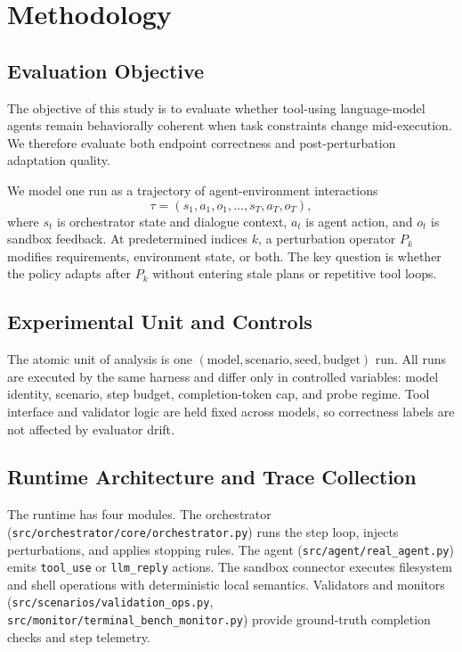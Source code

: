 \section{Methodology}
\label{sec:methodology}

\subsection{Evaluation Objective}
The objective of this study is to evaluate whether tool-using language-model agents remain behaviorally coherent when task constraints change mid-execution. We therefore evaluate both endpoint correctness and post-perturbation adaptation quality.

We model one run as a trajectory of agent-environment interactions
\[
\tau = (s_1, a_1, o_1, \dots, s_T, a_T, o_T),
\]
where \(s_t\) is orchestrator state and dialogue context, \(a_t\) is agent action, and \(o_t\) is sandbox feedback. At predetermined indices \(k\), a perturbation operator \(P_k\) modifies requirements, environment state, or both. The key question is whether the policy adapts after \(P_k\) without entering stale plans or repetitive tool loops.

\subsection{Experimental Unit and Controls}
The atomic unit of analysis is one \((\text{model}, \text{scenario}, \text{seed}, \text{budget})\) run. All runs are executed by the same harness and differ only in controlled variables: model identity, scenario, step budget, completion-token cap, and probe regime. Tool interface and validator logic are held fixed across models, so correctness labels are not affected by evaluator drift.

\subsection{Runtime Architecture and Trace Collection}
The runtime has four modules. The orchestrator (\texttt{src/orchestrator/core/orchestrator.py}) runs the step loop, injects perturbations, and applies stopping rules. The agent (\texttt{src/agent/real\_agent.py}) emits \texttt{tool\_use} or \texttt{llm\_reply} actions. The sandbox connector executes filesystem and shell operations with deterministic local semantics. Validators and monitors (\texttt{src/scenarios/validation\_ops.py}, \texttt{src/monitor/terminal\_bench\_monitor.py}) provide ground-truth completion checks and step telemetry.

